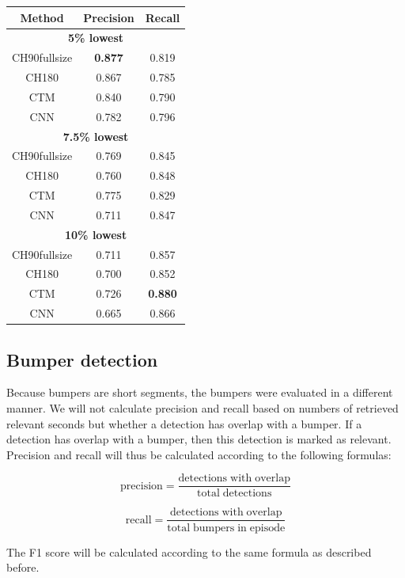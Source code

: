 \documentclass{article}
\begin{document}
\begin{center}
	\begin{tabular}{ c c c } 
		\hline
		\textbf{Method} & \textbf{Precision} & \textbf{Recall} \\
		\hline \hline
		\multicolumn{3}{c}{\textbf{5\% lowest}} \\
		\hline
		CH90fullsize 	& \textbf{0.877} 	& 0.819	\\
		CH180 			& 0.867 	& 0.785 \\
		CTM 			& 0.840 	& 0.790 \\
		CNN 			& 0.782		& 0.796	\\
		\hline
		\multicolumn{3}{c}{\textbf{7.5\% lowest}} \\
		\hline
		CH90fullsize 	& 0.769 	& 0.845	 \\	
		CH180 			& 0.760 	& 0.848  \\
		CTM 			& 0.775 	& 0.829  \\ 
		CNN 			& 0.711		& 0.847	 \\		
		\hline
		\multicolumn{3}{c}{\textbf{10\% lowest}} \\
		\hline
		CH90fullsize 	& 0.711 	& 0.857	 \\ 
		CH180 			& 0.700	 	& 0.852  \\ 
		CTM 			& 0.726 	& \textbf{0.880} \\ 
		CNN 			& 0.665		& 0.866  \\		
		\hline
	\end{tabular}
\end{center}

\subsection{Bumper detection}
Because bumpers are short segments, the bumpers were evaluated in a different manner. We will not calculate precision and recall based on numbers of retrieved relevant seconds but whether a detection has overlap with a bumper. If a detection has overlap with a bumper, then this detection is marked as relevant. Precision and recall will thus be calculated according to the following formulas:

\[\mathrm{precision} = \frac{\mathrm{detections\;with\;overlap}}{\mathrm{total\;detections}}\]

\[\mathrm{recall} = \frac{\mathrm{detections\;with\;overlap}}{\mathrm{total\;bumpers\;in\;episode}}\]

The F1 score will be calculated according to the same formula as described before.
\end{document}
